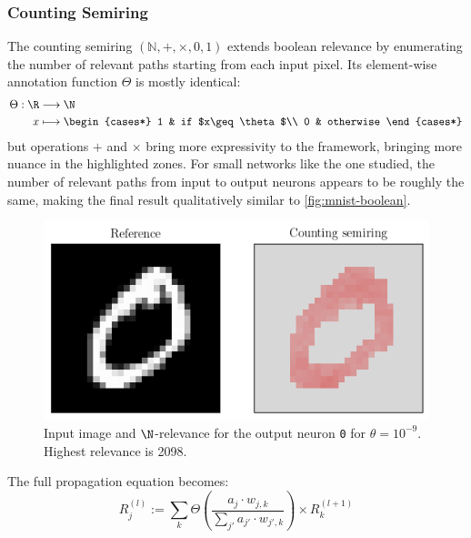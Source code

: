 \documentclass[twocolumn]{../cs-classes/cs-classes}
\newcommand*{\1}{\digitsbb{1}}
\newcommand*{\0}{\digitsbb{0}}
\begin{document}
\subsubsection{Counting Semiring}
The counting semiring $(\mathbb{N}, +, \times, 0, 1)$ extends boolean relevance by enumerating the number of relevant paths starting from each input pixel. Its element-wise annotation function $\Theta$ is mostly identical:
\begin{equation*}
    \begin{aligned}
        \Theta: \R&\longrightarrow\N\\
        x&\longmapsto \begin{cases*}
            1 & if $x\geq\theta$\\
            0 & otherwise
        \end{cases*}
    \end{aligned}
\end{equation*}
but operations $+$ and $\times$ bring more expressivity to the framework, bringing more nuance in the highlighted zones. For small networks like the one studied, the number of relevant paths from input to output neurons appears to be roughly the same, making the final result qualitatively similar to \autoref{fig:mnist-boolean}.

\begin{figure}[H]
    \centering
    \includegraphics[width=.9\linewidth]{counting.png}
    \caption{Input image and $\N$-relevance for the output neuron \texttt{0} for $\theta=10^{-9}$. Highest relevance is 2098.}
\end{figure}

The full propagation equation becomes:
\begin{equation}
    \tag{$\N$-LRP}
    R^{(l)}_j := \sum_{k}\Theta\left(\frac{a_j\cdot w_{j, k}}{\sum_{j'}a_{j'}\cdot w_{j', k}}\right) \times R^{(l+1)}_k
    \label{eq:counting-lrp}
\end{equation}
\end{document}
